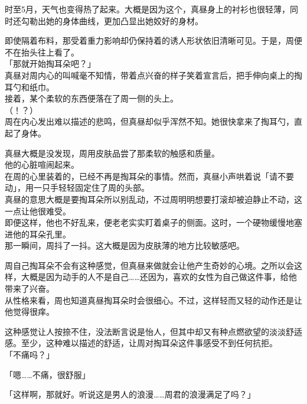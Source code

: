 时至5月，天气也变得热了起来。大概是因为这个，真昼身上的衬衫也很轻薄，同时还勾勒出她的身体曲线，更加凸显出她姣好的身材。

即使隔着布料，那受着重力影响却仍保持着的诱人形状依旧清晰可见。于是，周便不在抬头往上看了。\\

「那就开始掏耳朵吧？」\\

真昼对周内心的叫喊毫不知情，带着点兴奋的样子笑着宣言后，把手伸向桌上的掏耳勺和纸巾。\\

接着，某个柔软的东西便落在了周一侧的头上。\\

（！？）\\

周在内心发出难以描述的悲鸣，但真昼却似乎浑然不知。她很快拿来了掏耳勺，直起了身体。

真昼大概是没发现，周用皮肤品尝了那柔软的触感和质量。\\

他的心脏喧闹起来。\\

在周的心里装着的，已经不再是掏耳朵的事情。然而，真昼小声哄着说「请不要动」，用一只手轻轻固定住了周的头部。\\

真昼的意思大概是要掏耳朵所以别乱动，不过周明明想要打滚却被迫静止不动，这一点让他很难受。\\

即便这样，他也不好乱来，便老老实实盯着桌子的侧面。这时，一个硬物缓慢地塞进他的耳朵孔里。\\

那一瞬间，周抖了一抖。这大概是因为皮肤薄的地方比较敏感吧。

周自己掏耳朵不会有这种感觉，但真昼来做就会让他产生奇妙的心境。之所以会这样，大概是因为动手的人不是自己……还因为，喜欢的女性为自己做这件事，给他带来了兴奋。\\

从性格来看，周也知道真昼掏耳朵时会很细心。不过，这样轻而又轻的动作还是让他觉得很痒。

这种感觉让人按捺不住，没法断言说是怡人，但其中却又有种点燃欲望的淡淡舒适感。至少，这种难以描述的舒适，让周对掏耳朵这件事感受不到任何抗拒。\\

「不痛吗？」

「嗯……不痛，很舒服」

「这样啊，那就好。听说这是男人的浪漫……周君的浪漫满足了吗？」

